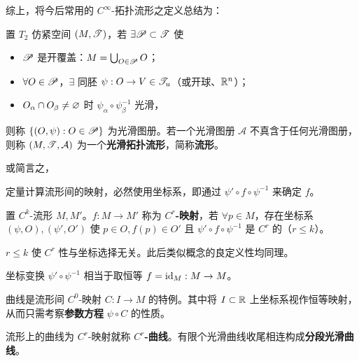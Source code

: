 综上，将今后常用的 $C^\infty$-拓扑流形之定义总结为：
\begin{tcolorbox}
\begin{definition}\label{def:smooth-manifold}
    置 $T_2$ 仿紧空间 $(M,\mathscr T)$，若 $\exists\mathscr P\subset\mathscr T$ 使
    \begin{itemize}
        \item $\mathscr P$ 是开覆盖：$M = \bigcup_{O\in\mathscr P}O$；
        \item $\forall O\in\mathscr P$，$\exists$ 同胚 $\psi:O\to V\in\mathscr T_u$（或开球、$\mathbb{R}^n$）；
        \item $O_\alpha\cap O_\beta\ne\varnothing$ 时 $\psi_\alpha\circ\psi_\beta^{-1}$ 光滑，
    \end{itemize}
    则称 $\{(O,\psi):O\in\mathscr P\}$ 为光滑图册。若一个光滑图册 $\mathcal A$ 不真含于任何光滑图册，则称 $(M,\mathscr T,\mathcal A)$ 为一个\textbf{光滑拓扑流形}，简称\textbf{流形}。
\end{definition}
\end{tcolorbox}
或简言之，
\begin{center}
\end{center}

定量计算流形间的映射，必然使用坐标系，即通过 $\psi'\circ f\circ \psi^{-1}$ 来确定 $f$。
\begin{definition}
    置 $C^k$-流形 $M,M'$。$f:M\to M'$ 称为 $C^r$\textbf{-映射}，若 $\forall p\in M$，存在坐标系 $(\psi,O),(\psi',O')$ 使 $p\in O,f(p)\in O'$ 且 $\psi'\circ f\circ \psi^{-1}$ 是 $C^r$ 的（$r\leqslant k$）。
\end{definition}

\begin{remark}
    $r\leqslant k$ 使 $C^r$ 性与坐标选择无关。此后类似概念的良定义性均同理。
\end{remark}

\begin{example}
    坐标变换 $\psi'\circ \psi^{-1}$ 相当于取恒等 $f=\mathrm{id}_M:M\to M$。
\end{example}
\begin{example}
    曲线是流形间 $C^0$-映射 $C:I\to M$ 的特例。其中将 $I\subset\mathbb{R}$ 上坐标系视作恒等映射，从而只需考察\textbf{参数方程} $\psi\circ C$ 的性质。
\end{example}

\begin{definition}
    流形上的曲线为 $C^r$-映射就称 $C^r$\textbf{-曲线}。有限个光滑曲线收尾相连构成\textbf{分段光滑曲线}。
\end{definition}

